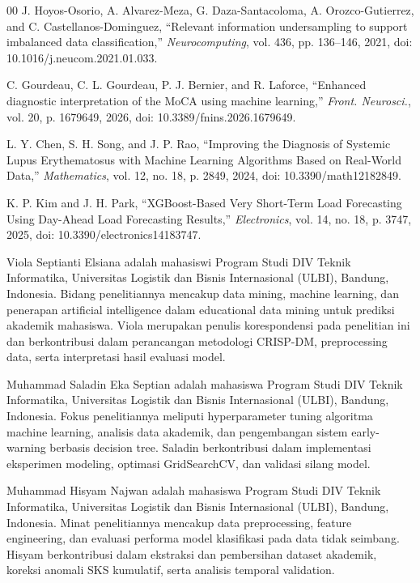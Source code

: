 \documentclass{ieeeaccess}
\begin{document}
\begin{thebibliography}{00}
 J. Hoyos-Osorio, A. Alvarez-Meza, G. Daza-Santacoloma, A. Orozco-Gutierrez, and C. Castellanos-Dominguez, ``Relevant information undersampling to support imbalanced data classification,'' \emph{Neurocomputing}, vol. 436, pp. 136--146, 2021, doi: 10.1016/j.neucom.2021.01.033.

 C. Gourdeau, C. L. Gourdeau, P. J. Bernier, and R. Laforce, ``Enhanced diagnostic interpretation of the MoCA using machine learning,'' \emph{Front. Neurosci.}, vol. 20, p. 1679649, 2026, doi: 10.3389/fnins.2026.1679649.

 L. Y. Chen, S. H. Song, and J. P. Rao, ``Improving the Diagnosis of Systemic Lupus Erythematosus with Machine Learning Algorithms Based on Real-World Data,'' \emph{Mathematics}, vol. 12, no. 18, p. 2849, 2024, doi: 10.3390/math12182849.

 K. P. Kim and J. H. Park, ``XGBoost-Based Very Short-Term Load Forecasting Using Day-Ahead Load Forecasting Results,'' \emph{Electronics}, vol. 14, no. 18, p. 3747, 2025, doi: 10.3390/electronics14183747.

\end{thebibliography}

\begin{IEEEbiographynophoto}{Viola Septianti Elsiana} adalah mahasiswi Program Studi DIV Teknik Informatika, Universitas Logistik dan Bisnis Internasional (ULBI), Bandung, Indonesia. Bidang penelitiannya mencakup data mining, machine learning, dan penerapan artificial intelligence dalam educational data mining untuk prediksi akademik mahasiswa. Viola merupakan penulis korespondensi pada penelitian ini dan berkontribusi dalam perancangan metodologi CRISP-DM, preprocessing data, serta interpretasi hasil evaluasi model.
\end{IEEEbiographynophoto}

\begin{IEEEbiographynophoto}{Muhammad Saladin Eka Septian} adalah mahasiswa Program Studi DIV Teknik Informatika, Universitas Logistik dan Bisnis Internasional (ULBI), Bandung, Indonesia. Fokus penelitiannya meliputi hyperparameter tuning algoritma machine learning, analisis data akademik, dan pengembangan sistem early-warning berbasis decision tree. Saladin berkontribusi dalam implementasi eksperimen modeling, optimasi GridSearchCV, dan validasi silang model.
\end{IEEEbiographynophoto}

\begin{IEEEbiographynophoto}{Muhammad Hisyam Najwan} adalah mahasiswa Program Studi DIV Teknik Informatika, Universitas Logistik dan Bisnis Internasional (ULBI), Bandung, Indonesia. Minat penelitiannya mencakup data preprocessing, feature engineering, dan evaluasi performa model klasifikasi pada data tidak seimbang. Hisyam berkontribusi dalam ekstraksi dan pembersihan dataset akademik, koreksi anomali SKS kumulatif, serta analisis temporal validation.
\end{IEEEbiographynophoto}

\EOD
\end{document}
